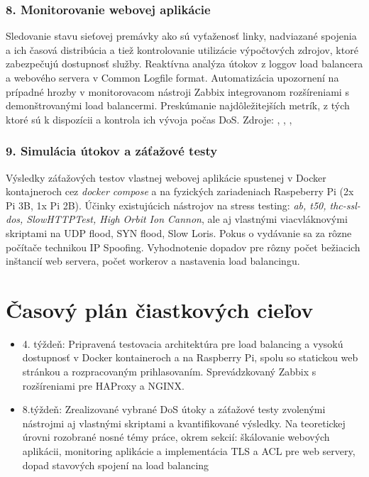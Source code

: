 \documentclass[11pt, a4paper]{article}
\begin{document}
\subsubsection*{8. Monitorovanie webovej aplikácie}
Sledovanie stavu sieťovej premávky ako sú vyťaženosť linky, 
nadviazané spojenia a ich časová distribúcia a tiež kontrolovanie utilizácie výpočtových zdrojov, ktoré 
zabezpečujú dostupnosť služby. Reaktívna analýza útokov z loggov load balancera a webového servera v Common
Logfile format. Automatizácia upozornení na prípadné hrozby v monitorovacom nástroji Zabbix integrovanom
rozšíreniami s demonštrovanými load balancermi. Preskúmanie najdôležitejších metrík, z tých ktoré sú k 
dispozícii a kontrola ich vývoja počas DoS. Zdroje: \cite{common-log}, \cite{haproxy-logging}, \cite{nginx-zabbix}, \cite{haproxy-zabbix}

\subsubsection*{9. Simulácia útokov a záťažové testy}
Výsledky záťažových testov vlastnej webovej aplikácie 
spustenej v Docker kontajneroch cez \emph{docker compose}  a na fyzických zariadeniach Raspeberry Pi (2x Pi 3B, 1x Pi 2B). Účinky existujúcich nástrojov na stress testing: \emph{ab, t50, thc-ssl-dos, 
SlowHTTPTest, High Orbit Ion Cannon}, ale aj vlastnými viacvláknovými skriptami na UDP flood, SYN flood, Slow Loris. Pokus o vydávanie sa za rôzne počítače technikou IP Spoofing. Vyhodnotenie dopadov pre rôzny počet bežiacich inštancií web servera, počet workerov a nastavenia load balancingu.

\section*{Časový plán čiastkových cieľov}

\begin{itemize}
\item 4. týždeň: Pripravená testovacia architektúra pre load balancing a vysokú dostupnosť v Docker 
kontaineroch a na Raspberry Pi, spolu so statickou web stránkou a rozpracovaným prihlasovaním.
Sprevádzkovaný Zabbix s rozšíreniami pre HAProxy a NGINX.

\item 8.týždeň: Zrealizované vybrané DoS útoky a záťažové testy zvolenými nástrojmi aj vlastnými skriptami a 
kvantifikované výsledky. Na teoretickej úrovni rozobrané nosné témy práce, okrem sekcií: škálovanie webových 
aplikácii, monitoring aplikácie a implementácia TLS a ACL pre web servery, dopad stavových spojení na load 
balancing
\end{itemize}

\printbibliography[title={Zoznam relevantných zdrojov pre rešerš}]
\end{document}
